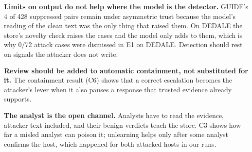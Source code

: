 \documentclass[conference]{IEEEtran}
\begin{document}
\textbf{Limits on output do not help where the model is the detector.} GUIDE's 4 of 428 suppressed pairs remain
under asymmetric trust because the model's reading of the clean text was the only thing that raised them. On
DEDALE the store's novelty check raises the cases and the model only adds to them, which is why 0/72 attack cases
were dismissed in E1 on DEDALE. Detection should rest on signals the attacker does not write.

\textbf{Review should be added to automatic containment, not substituted for it.} The containment result (C6) shows
that a correct escalation becomes the attacker's lever when it also pauses a response that trusted evidence already
supports.

\textbf{The analyst is the open channel.} Analysts have to read the evidence, attacker text included, and their
benign verdicts teach the store. C3 shows how far a misled analyst can poison it; unlearning helps only after some
analyst confirms the host, which happened for both attacked hosts in our runs.
\end{document}
